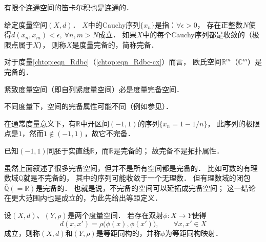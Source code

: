 \begin{proposition}
    有限个连通空间的笛卡尔积也是连通的．
\end{proposition}


\begin{definition}\label{chtop:def_complete-metric}
    给定度量空间$(X,d)$．
    $X$中的Cauchy序列$\{x_n\}$是指：$\forall \epsilon >0 $，
    存在正整数$N$使得$d(x_n,x_m)<\epsilon,\ \forall n,m>N$成立．
    如果$X$中的每个Cauchy序列都是收敛的（极限点属于$X$），
    则称$X$是{\heiti 度量完备}的，简称{\heiti 完备}．
\end{definition}

 
    
\begin{proposition}
    对于度量\eqref{chtop:eqn_Rdbc}（\eqref{chtop:eqn_Rdbc-cx}）而言，
    欧氏空间$\mathbb{R}^m$（$\mathbb{C}^m$）是完备的．
\end{proposition}

\begin{theorem}
	紧致度量空间（即自列紧度量空间）必是度量完备空间．
\end{theorem}


\begin{remark}\label{chtop:rem_nc}
	不同度量下，空间的完备属性可能不同（例如参见\parencite[1.5-5, 1.5-9]{Kreyszig-1991}）．
\end{remark}


\begin{example}
    在通常度量意义下，有$\mathbb{R}$中开区间$(-1,1)$的序列$\{x_n=1-1/n\}$，
    此序列的极限点是$1$，然而$1 \notin (-1,1)$，故它不完备．
    
    已知$(-1,1)$同胚于实直线$\mathbb{R}$，而$\mathbb{R}$是完备的；
    故{\kaishu 完备不是拓扑属性}．
\end{example}

虽然上面叙述了很多完备空间，但并不是所有空间都是完备的．
比如可数的有理数域$\mathbb{Q}$就是不完备的，
其中的序列可能收敛于一个无理数．
但有理数域的闭包$\bar{\mathbb{Q}}(=\mathbb{R})$是完备的．
也就是说，不完备的空间可以延拓成完备空间；
这一结论在更大范围内也是成立的，为此先给出等距定义．


\begin{definition}
	设$(X,d)$、$(Y, \rho)$是两个度量空间．
	若存在双射$\phi: X \rightarrow Y$使得
	\begin{equation*}
		d(x, x')=\rho\bigl(\phi(x) , \phi (x')\bigr), \qquad \forall x, x' \in X
	\end{equation*}
	成立，则称$(X, d)$和$(Y, \rho)$是{\heiti 等距同构的}，并称$\phi$为{\heiti 等距同构映射}．
\end{definition}

